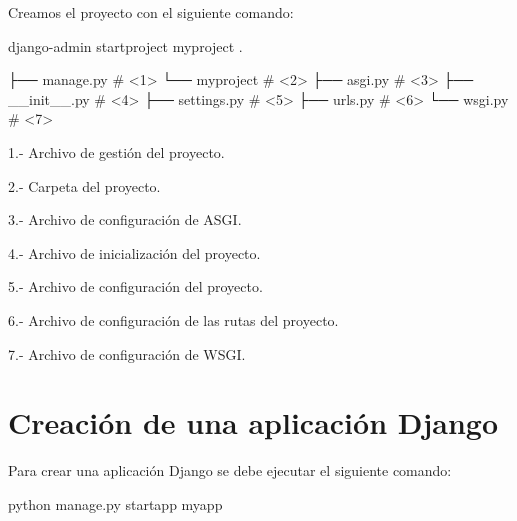 \documentclass[
  a4paper,
  DIV=11,
  numbers=noendperiod,
  onepage,
  openany]{scrreprt}
\newenvironment{Shaded}{\begin{snugshade}}{\end{snugshade}}
\newcommand{\ExtensionTok}[1]{\textcolor[rgb]{0.00,0.23,0.31}{#1}}
\newcommand{\NormalTok}[1]{\textcolor[rgb]{0.00,0.23,0.31}{#1}}
\newcommand*\circled[1]{\tikz[baseline=(char.base)]{
          \node[shape=circle,draw,inner sep=1pt] (char) {{\scriptsize#1}};}}
\begin{document}
\begin{tcolorbox}
\begin{tcolorbox}
Creamos el proyecto con el siguiente comando:

\begin{Shaded}
\begin{Highlighting}[]
\ExtensionTok{django{-}admin}\NormalTok{ startproject myproject .}
\end{Highlighting}
\end{Shaded}

\end{tcolorbox}

\label{annotated-cell-185}%
\begin{Shaded}
\begin{Highlighting}[]
\NormalTok{├── manage.py \# \textless{}1\textgreater{}}
\NormalTok{└── myproject \# \textless{}2\textgreater{}}
\NormalTok{    ├── asgi.py \# \textless{}3\textgreater{}}
\NormalTok{    ├── \_\_init\_\_.py \# \textless{}4\textgreater{}}
\NormalTok{    ├── settings.py \# \textless{}5\textgreater{}}
\NormalTok{    ├── urls.py \# \textless{}6\textgreater{}}
\NormalTok{    └── wsgi.py \# \textless{}7\textgreater{}}
\end{Highlighting}
\end{Shaded}

1.- Archivo de gestión del proyecto.

2.- Carpeta del proyecto.

3.- Archivo de configuración de ASGI.

4.- Archivo de inicialización del proyecto.

5.- Archivo de configuración del proyecto.

6.- Archivo de configuración de las rutas del proyecto.

7.- Archivo de configuración de WSGI.

\chapter{Creación de una aplicación
Django}\label{creaciuxf3n-de-una-aplicaciuxf3n-django}

Para crear una aplicación Django se debe ejecutar el siguiente comando:

\label{annotated-cell-186}%
\begin{Shaded}
\begin{Highlighting}[]
\ExtensionTok{python}\NormalTok{ manage.py startapp myapp }\hspace*{\fill}\NormalTok{\circled{1}}
\end{Highlighting}
\end{Shaded}


\end{tcolorbox}
\end{document}
